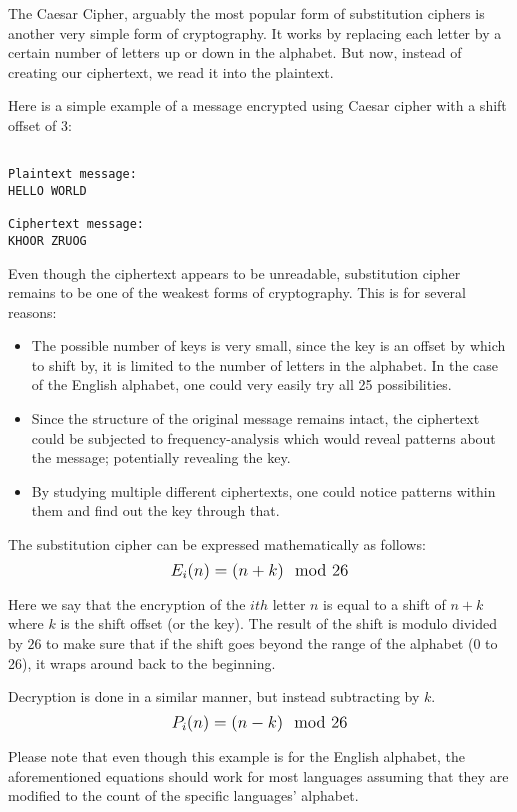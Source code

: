 The Caesar Cipher, arguably the most popular form of substitution ciphers is another very simple form of cryptography. 
It works by replacing each letter by a certain number of letters up or down in the alphabet. But now, instead of 
creating our ciphertext, we read it into the plaintext.



Here is a simple example of a message encrypted using Caesar cipher with a shift offset of 3:

\begin{verbatim}

Plaintext message: 
HELLO WORLD
               
Ciphertext message:
KHOOR ZRUOG
\end{verbatim}

Even though the ciphertext appears to be unreadable, substitution cipher remains to be one of the weakest forms of cryptography. 
This is for several reasons:
\begin{itemize}  
    \item The possible number of keys is very small, since the key is an offset by which to shift by, it is limited to the number of letters in the alphabet.
    In the case of the English alphabet, one could very easily try all 25 possibilities. 
    \item Since the structure of the original message remains intact, the ciphertext could be subjected to frequency-analysis which would reveal patterns about the message;
    potentially revealing the key.
    \item By studying multiple different ciphertexts, one could notice patterns within them and find out the key through that.
\end{itemize}

The substitution cipher can be expressed mathematically as follows: $$\mathlarger{E_i(n)=(n+k)\mod{26}}$$

Here we say that the encryption of the $ith$ letter $n$ is equal to a shift of $n+k$ where $k$ is the shift offset (or the key). The result of the shift
is modulo divided by $26$ to make sure that if the shift goes beyond the range of the alphabet (0 to 26),  it wraps around back to the beginning.

Decryption is done in a similar manner, but instead subtracting by $k$. $$\mathlarger{P_i(n)=(n-k)\mod{26}}$$

Please note that even though this example is for the English alphabet, the aforementioned equations should work for most languages assuming that they are modified
to the count of the specific languages' alphabet.
